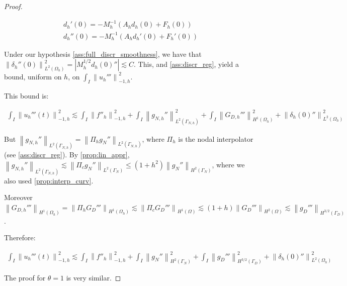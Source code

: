 \documentclass[english,a4paper,10pt,oneside]{scrbook}	%
\theoremstyle{break}
\newenvironment{mproof}[1][\proofname]{%
  \begin{proof}[#1]$ $\par\nobreak\ignorespaces
}{%
  \end{proof}
}
\renewcommand*{\proofname}{Proof}
\theoremstyle{remark}
\newcommand{\ds}{\displaystyle}
\newcommand{\norm}[1]{\left\lVert#1\right\rVert}
\begin{document}
\begin{mproof}
\begin{align*}
	d_h'(0)=-M_h^{-1}(A_h d_h(0)+F_h(0))\\
	d_h''(0)=-M_h^{-1}(A_h d_h'(0)+F_h'(0))
\end{align*}

Under our hypothesis \cref{ass:full_discr_smoothness}, we have that $\norm{\delta_h''(0)}_{L^2(\Omega_h)}^2 = |M^{1/2}_hd_h(0)''|\lesssim C$. This, and \cref{ass:discr_reg}, yield a bound, uniform on $h$, on $\ds \int_I \norm{u_h'''}_{-1,h}^2$.

This bound is:

\begin{align*}
	\int_I \norm{u_h'''(t)}_{-1,h}^2\lesssim \int_I \norm{f''_h}_{-1,h}^2+\int_I\norm{g_{N,h}''}_{L^2(\Gamma_{N,h})}^2 + \int_I\norm{G_{D,h}'''}_{H^1(\Omega_h)}^2 + \norm{\delta_{h}(0)''}_{L^2(\Omega_h)}^2
\end{align*}

But $\norm{g_{N,h}''}_{L^2(\Gamma_{N,h})}=\norm{\Pi_h g_{N}''}_{L^2(\Gamma_{N,h})}$, where $\Pi_h$ is the nodal interpolator (see \cref{ass:discr_reg}). By \cref{prop:lin_appr}, $\norm{g_{N,h}''}_{L^2(\Gamma_{N,h})}\lesssim \norm{\Pi_c g_{N}''}_{L^2(\Gamma_{N})}\leq (1+h^2)\norm{ g_{N}''}_{H^2(\Gamma_{N})}$, where we also used \cref{prop:interp_curv}.

Moreover $\norm{G_{D,h}'''}_{H^1(\Omega_h)} = \norm{\Pi_h G_D'''}_{H^1(\Omega_h)}\lesssim  \norm{\Pi_c G_D'''}_{H^1(\Omega)}\lesssim (1+h)\norm{G_D'''}_{H^2(\Omega)}\lesssim \norm{g_D'''}_{H^{3/2}(\Gamma_D)}$.

Therefore:

\begin{align*}
	\int_I \norm{u_h'''(t)}_{-1,h}^2\lesssim \int_I \norm{f''_h}_{-1,h}^2+\int_I\norm{ g_{N}''}_{H^{2}(\Gamma_{N})}^2 + \int_I\norm{g_D'''}_{H^{3/2}(\Gamma_D)}^2 + \norm{\delta_{h}(0)''}_{L^2(\Omega_h)}^2
\end{align*}


The proof for $\theta=1$ is very similar.


\end{mproof}
\end{document}
